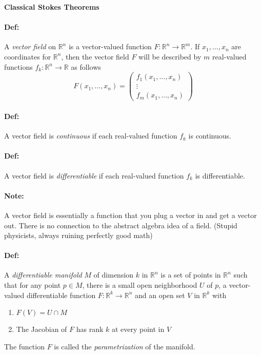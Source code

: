 \documentclass[10pt,a4paper]{article}
\begin{document}
\begin{center}
\textbf{Classical Stokes Theorems}
\end{center}

\paragraph{Def:} A \textit{vector field} on $\mathbb{R}^n$ is a vector-valued function $F: \mathbb{R}^n \to \mathbb{R}^m$. If $x_1,\dots,x_n$ are coordinates for $\mathbb{R}^n$, then the vector field $F$ will be described by $m$ real-valued functions $f_k: \mathbb{R}^n \to \mathbb{R}$ as follows
$$ F(x_1,\dots,x_n) = 
\begin{pmatrix}
f_1(x_1,\dots,x_n)\\
\vdots\\
f_m(x_1,\dots,x_n)
\end{pmatrix}$$

\paragraph{Def:} A vector field is \textit{continuous} if each real-valued function $f_k$ is continuous.

\paragraph{Def:} A vector field is \textit{differentiable} if each real-valued function $f_k$ is differentiable.

\paragraph{Note:} A vector field is essentially a function that you plug a vector in and get a vector out. There is no connection to the abstract algebra idea of a field. (Stupid physicists, always ruining perfectly good math)

\paragraph{Def:} A \textit{differentiable manifold} $M$ of dimension $k$ in $\mathbb{R}^n$ is a set of points in $\mathbb{R}^n$ such that for any point $p \in M$, there is a small open neighborhood $U$ of $p$, a vector-valued differentiable function $F:\mathbb{R}^k \to \mathbb{R}^n$ and an open set $V$ in $\mathbb{R}^k$ with
\begin{enumerate}
\item $F(V) = U \cap M$
\item The Jacobian of $F$ has rank $k$ at every point in $V$
\end{enumerate}
The function $F$ is called the \textit{parametrization} of the manifold.
\end{document}
